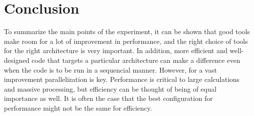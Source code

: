 \documentclass[fleqn,11pt]{SelfArx} %
\theoremstyle{definition}
\begin{document}
\section{Conclusion}
To summarize the main points of the experiment, it can be shown that good tools make room for a lot of improvement in performance, and the right choice of tools for the right architecture is very important. In addition, more efficient and well-designed code that targets a particular architecture can make a difference even when the code is to be run in a sequencial manner. However, for a vast improvement parallelization is key. Performance is critical to large calculations and massive processing, but efficiency can be thought of being of equal importance as well. It is often the case that the best configuration for performance might not be the same for efficiency.
\end{document}
